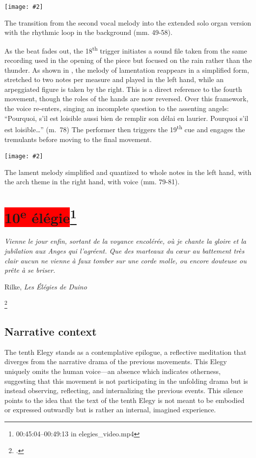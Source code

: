 \documentclass[12pt,twoside,maitrise]{dms_ks}
\newcommand{\customincludeexamples}[4][]{%
    \begin{example}[H]
        \centering
        \texttt{[image: \#2]}
        \caption{#4}
	\label{#3} 
    \end{example}
}
\theoremstyle{definition}
\begin{document}
{\customincludeexamples[width=\textwidth]{9e_2}{ex:9e_2}{The transition from the second vocal melody into the extended solo organ version with the rhythmic loop in the background (mm. 49-58).}

As the beat fades out, the 18\textsuperscript{th} trigger initiates a sound file taken from the same recording used in the opening of the piece but focused on the rain rather than the thunder. 
As shown in , the melody of lamentation reappears in a simplified form, stretched to two notes per measure and played in the left hand, while an arpeggiated figure is taken by the right. 
This is a direct reference to the fourth movement, though the roles of the hands are now reversed. 
Over this framework, the voice re-enters, singing an incomplete question to the assenting angels: “Pourquoi, s'il est loisible aussi bien de remplir son délai en laurier. Pourquoi s'il est loisible…” (m.~78)
The performer then triggers the 19\textsuperscript{th} cue and engages the tremulants before moving to the final movement. 

\customincludeexamples[width=\textwidth]{9e_3}{ex:9e_3}{The lament melody simplified and quantized to whole notes in the left hand, with the arch theme in the right hand, with voice (mm. 79-81).}

\section{\colorbox{red}{10\textsuperscript{e} élégie}\footnote{00:45:04--00:49:13 in elegies\_video.mp4}}

\epigraph{\textit{Vienne le jour enfin, sortant de la voyance encolérée, où je chante la gloire et la jubilation aux Anges qui l’agréent. Que des marteaux du cœur au battement très clair aucun ne vienne à faux tomber sur une corde molle, ou encore douteuse ou prête à se briser.}}{Rilke, \textit{Les Élégies de Duino}\protect\footnotemark}

\footcitetext[91]{rilke_egies_1986}

\subsection{Narrative context}

The tenth Elegy stands as a contemplative epilogue, a reflective meditation that diverges from the narrative drama of the previous movements. 
This Elegy uniquely omits the human voice---an absence which indicates otherness, suggesting that this movement is not participating in the unfolding drama but is instead observing, reflecting, and internalizing the previous events. 
This silence points to the idea that the text of the tenth Elegy is not meant to be embodied or expressed outwardly but is rather an internal, imagined experience.

}
\end{document}
